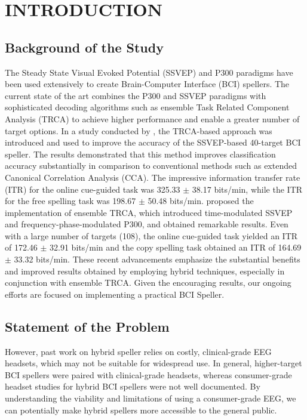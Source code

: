 \chapter{INTRODUCTION} 

\section{Background of the Study}

The Steady State Visual Evoked Potential (SSVEP) and P300 paradigms have been used extensively to create Brain-Computer Interface (BCI) spellers.
The current state of the art combines the P300 and SSVEP paradigms with sophisticated decoding algorithms such as ensemble Task Related Component Analysis (TRCA) to achieve higher performance and enable a greater number of target options.
In a study conducted by \cite{nakanishi2017enhancing}, the TRCA-based approach was introduced and used to improve the accuracy of the SSVEP-based 40-target BCI speller. The results demonstrated that this method improves classification accuracy substantially in comparison to conventional methods such as extended Canonical Correlation Analysis (CCA). 
The impressive information transfer rate (ITR) for the online cue-guided task was 325.33 $\pm$ 38.17 bits/min, while the ITR for the free spelling task was 198.67 $\pm$ 50.48 bits/min.
\cite{xu2020implementing} proposed the implementation of ensemble TRCA, which introduced time-modulated SSVEP and frequency-phase-modulated P300, and obtained remarkable results. 
Even with a large number of targets (108), the online cue-guided task yielded an ITR of 172.46 $\pm$ 32.91 bits/min and the copy spelling task obtained an ITR of 164.69 $\pm$ 33.32 bits/min.  
These recent advancements emphasize the substantial benefits and improved results obtained by employing hybrid techniques, especially in conjunction with ensemble TRCA.
Given the encouraging results, our ongoing efforts are focused on implementing a practical BCI Speller.

\section{Statement of the Problem}

However, past work on hybrid speller relies on costly, clinical-grade EEG headsets, which may not be suitable for widespread use. In general, higher-target BCI spellers were paired with clinical-grade headsets, whereas consumer-grade headset studies for hybrid BCI spellers were not well documented.
By understanding the viability and limitations of using a consumer-grade EEG, we can potentially make hybrid spellers more accessible to the general public.

